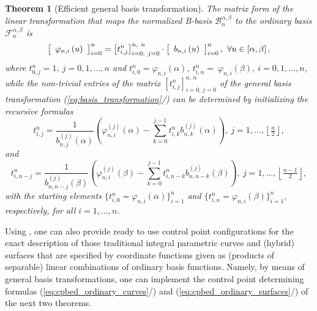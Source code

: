 \documentclass[b5paper, twosided]{book}
\newtheorem{theorem}{Theorem}[chapter]
\DeclareRobustCommand{\mref}[1]{\ref{#1}{\relsize{-1}/\pageref{#1}}}
\begin{document}
\begin{theorem}[Efficient general basis transformation]\label{thm:efficient_basis_transformation}
	The matrix form of the
	linear transformation that maps the normalized B-basis $\mathcal{B}%
	_{n}^{\alpha,\beta}$ to the ordinary basis $\mathcal{F}_{n}^{\alpha,\beta}$ is%
	\begin{equation}
	\left[
	\begin{array}
	[c]{c}%
	\varphi_{n,i}\left(  u\right)
	\end{array}
	\right]  _{i=0}^{n}=\left[  t_{i,j}^{n}\right]  _{i=0,~j=0}^{n,~n}\cdot\left[
	\begin{array}
	[c]{c}%
	b_{n,i}\left(  u\right)
	\end{array}
	\right]  _{i=0}^{n},~\forall u\in\left[  \alpha,\beta\right]  ,
	\label{eq:basis_transformation}%
	\end{equation}
	where $t_{0,j}^{n}=1,~j=0,1,\ldots,n$ and $t_{i,0}^{n}= \varphi_{n,i}\left(  \alpha\right),~
	t_{i,n}^{n}=  ~\varphi_{n,i}\left(  \beta\right)  ,~i=0,1,\ldots
	,n$, while the
	non-trivial entries of the matrix $[t_{i,j}^{n}]_{i=0,\,j=0}^{n,\,n}$ of the general basis transformation (\mref{eq:basis_transformation}) can be determined by initializing the recursive formulas
	\begin{equation}
	\label{eq:efficient_first_half}
	t_{i,j}^{n} = \frac{1}{b_{n,j}^{\left(j\right)}\left(\alpha\right)}
	\left(\varphi_{n,i}^{\left(j\right)}\left(\alpha\right)-\sum_{k=0}^{j-1} t_{i,k}^{n} b_{n,k}^{\left(j\right)}\left(\alpha\right)\right),~j=1,\ldots,\left\lfloor\tfrac{n}{2}\right\rfloor,
	\end{equation}
	and
	\begin{equation}
	\label{eq:efficient_last_half}
	t_{i,n-j}^{n} = \frac{1}{b_{n,n-j}^{\left(j\right)}\left(\beta\right)}
	\left(\varphi_{n,i}^{\left(j\right)}\left(\beta\right)-\sum_{k=0}^{j-1} t_{i,n-k}^{n} b_{n,n-k}^{\left(j\right)}\left(\beta\right)\right),~j=1,\ldots,\left\lfloor\tfrac{n-1}{2}\right\rfloor,
	\end{equation}
	with the starting elements 
	$
	\{
	t_{i,0}^{n} = \varphi_{n,i}\left(\alpha\right)
	\}_{i=1}^{n}
	$
	and
	$
	\{
	t_{i,n}^{n} = \varphi_{n,i}\left(\beta\right)\}_{i=1}^{n},
	$
	respectively, for all $i=1,\ldots,n$.
\end{theorem}


Using \cite[Corollary 2.1, p. 43]{Roth2015b}, one can also provide ready to use control point configurations for the exact description of those traditional integral parametric curves and (hybrid) surfaces that are specified by coordinate functions given as (products of separable) linear combinations of ordinary basis functions. Namely, by means of general basis transformations, one can implement the control point determining formulas (\mref{eq:cpbed_ordinary_curves}) and (\mref{eq:cpbed_ordinary_surfaces}) of the next two theorems.
\end{document}
